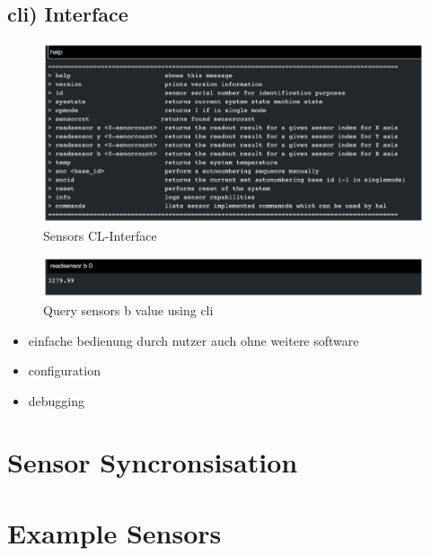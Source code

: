\hypertarget{cli-interface}{%
\subsection{\texorpdfstring{\gls{cli})
Interface}{ Interface}}\label{cli-interface}}

\begin{figure}
\centering
\includegraphics{./generated_images/border_Sensors_CL-Interface.png}
\caption{Sensors CL-Interface \label{Sensors_CL-Interface.png}}
\end{figure}

\begin{figure}
\centering
\includegraphics{./generated_images/border_Query_sensors_b_value_using_(+cli).png}
\caption{Query sensors b value using \gls{cli}
\label{Query_sensors_b_value_using_(+cli).png}}
\end{figure}

\begin{itemize}
\tightlist
\item
  einfache bedienung durch nutzer auch ohne weitere software
\item
  configuration
\item
  debugging
\end{itemize}

\hypertarget{sensor-syncronsisation}{%
\section{Sensor Syncronsisation}\label{sensor-syncronsisation}}

\hypertarget{example-sensors}{%
\section{Example Sensors}\label{example-sensors}}

